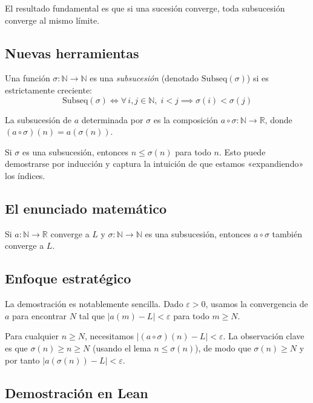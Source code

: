 El resultado fundamental es que si una sucesión converge, toda subsucesión
converge al mismo límite.

\subsection{Nuevas herramientas}

\begin{definicion}[Subseq]
  Una función $\sigma:\mathbb{N}\to\mathbb{N}$ es una \emph{subsucesión}
  (denotado $\mathrm{Subseq}(\sigma)$) si es estrictamente creciente:
  \[
    \mathrm{Subseq}(\sigma) \iff \forall\, i,j\in\mathbb{N},\;
    i < j \implies \sigma(i) < \sigma(j)
  \]

  La subsucesión de $a$ determinada por $\sigma$ es la composición
  $a\circ\sigma:\mathbb{N}\to\mathbb{R}$, donde $(a\circ\sigma)(n)=a(\sigma(n))$.
\end{definicion}

\begin{lemma}[SubseqGe]
  Si $\sigma$ es una subsucesión, entonces $n\leq\sigma(n)$ para todo $n$.
  Esto puede demostrarse por inducción y captura la intuición de que estamos
  «expandiendo» los índices.
\end{lemma}

\subsection{El enunciado matemático}

\begin{theorem}[SubseqConv]
  Si $a:\mathbb{N}\to\mathbb{R}$ converge a $L$ y $\sigma:\mathbb{N}\to\mathbb{N}$
  es una subsucesión, entonces $a\circ\sigma$ también converge a $L$.
\end{theorem}

\subsection{Enfoque estratégico}

La demostración es notablemente sencilla. Dado $\varepsilon>0$, usamos la
convergencia de $a$ para encontrar $N$ tal que $|a(m)-L|<\varepsilon$ para
todo $m\geq N$.

Para cualquier $n\geq N$, necesitamos $|(a\circ\sigma)(n)-L|<\varepsilon$.
La observación clave es que $\sigma(n)\geq n\geq N$ (usando el lema
$n\leq\sigma(n)$), de modo que $\sigma(n)\geq N$ y por tanto
$|a(\sigma(n))-L|<\varepsilon$.

\subsection{Demostración en Lean}

